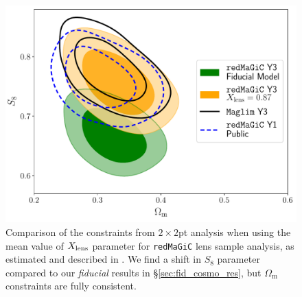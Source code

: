 \documentclass[aps, prd,twocolumn,superscriptaddress,nofootinbib,preprintnumbers]{revtex4-1}
\newcommand{\om}{\ensuremath{\Omega_{\mathrm m}}}
\newcommand{\redmagic}{\texttt{redMaGiC} }
\begin{document}
\begin{figure}
\includegraphics[width=\columnwidth]{figs/data_lcdm_wX_comp.pdf}
\caption[]{Comparison of the constraints from $2\times2$pt analysis when using the mean value of $X_{\rm lens}$ parameter for \redmagic lens sample analysis, as estimated and described in \citet*{y3-3x2ptkp}. We find a shift in $S_8$ parameter compared to our \textit{fiducial} results in \S\ref{sec:fid_cosmo_res}, but $\om$ constraints are fully consistent.   }\label{fig:X_comp_main}
\end{figure}
\end{document}
